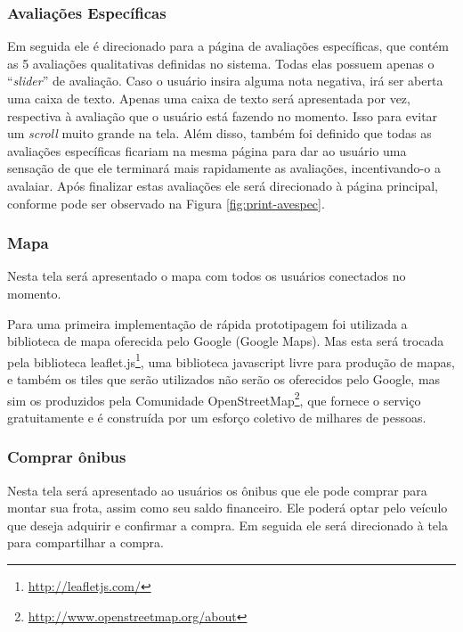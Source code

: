 \subsubsection{Avaliações Específicas}
Em seguida ele é direcionado para a página de avaliações específicas, que contém as 5 avaliações qualitativas definidas no sistema. Todas elas possuem apenas o ``\textit{slider}'' de avaliação. Caso o usuário insira alguma nota negativa, irá ser aberta uma caixa de texto. Apenas uma caixa de texto será apresentada por vez, respectiva à avaliação que o usuário está fazendo no momento. Isso para evitar um \textit{scroll} muito grande na tela. Além disso, também foi definido que todas as avaliações específicas ficariam na mesma página para dar ao usuário uma sensação de que ele terminará mais rapidamente as avaliações, incentivando-o a avalaiar. Após finalizar estas avaliações ele será direcionado à página principal, conforme pode ser observado na Figura \ref{fig:print-avespec}.
    
\subsubsection{Mapa}
Nesta tela será apresentado o mapa com todos os usuários conectados no momento.
    
Para uma primeira implementação de rápida prototipagem foi utilizada a biblioteca de mapa oferecida pelo Google (Google Maps). Mas esta será trocada pela biblioteca leaflet.js\footnote{\url{http://leafletjs.com/}}, uma biblioteca javascript livre para produção de mapas, e também os tiles que serão utilizados não serão os oferecidos pelo Google, mas sim os produzidos pela Comunidade OpenStreetMap\footnote{\url{http://www.openstreetmap.org/about}}, que fornece o serviço gratuitamente e é construída por um esforço coletivo de milhares de pessoas.
    
\subsubsection{Comprar ônibus}
Nesta tela será apresentado ao usuários os ônibus que ele pode comprar para montar sua frota, assim como seu saldo financeiro. Ele poderá optar pelo veículo que deseja adquirir e confirmar a compra. Em seguida ele será direcionado à tela para compartilhar a compra.
    
